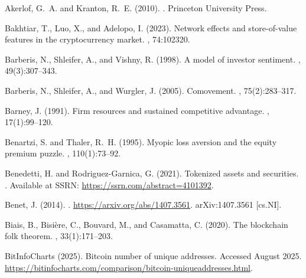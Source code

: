 \documentclass[12pt]{article}
\begin{document}
\begin{thebibliography}{}

Akerlof, G.~A. and Kranton, R.~E. (2010).
.
\newblock Princeton University Press.

Bakhtiar, T., Luo, X., and Adelopo, I. (2023).
\newblock Network effects and store-of-value features in the cryptocurrency
  market.
, 74:102320.

Barberis, N., Shleifer, A., and Vishny, R. (1998).
\newblock A model of investor sentiment.
, 49(3):307--343.

Barberis, N., Shleifer, A., and Wurgler, J. (2005).
\newblock Comovement.
, 75(2):283--317.

Barney, J. (1991).
\newblock Firm resources and sustained competitive advantage.
, 17(1):99--120.

Benartzi, S. and Thaler, R.~H. (1995).
\newblock Myopic loss aversion and the equity premium puzzle.
, 110(1):73--92.

Benedetti, H. and Rodriguez-Garnica, G. (2021).
\newblock Tokenized assets and securities.
.
\newblock Available at SSRN: \url{https://ssrn.com/abstract=4101392}.

Benet, J. (2014).
.
\newblock \url{https://arxiv.org/abs/1407.3561}.
\newblock arXiv:1407.3561 [cs.NI].

Biais, B., Bisi{\`e}re, C., Bouvard, M., and Casamatta, C. (2020).
\newblock The blockchain folk theorem.
, 33(1):171--203.

{BitInfoCharts} (2025).
\newblock Bitcoin number of unique addresses.
\newblock Accessed August 2025.
\newblock
  \url{https://bitinfocharts.com/comparison/bitcoin-uniqueaddresses.html}.


\end{thebibliography}
\end{document}
